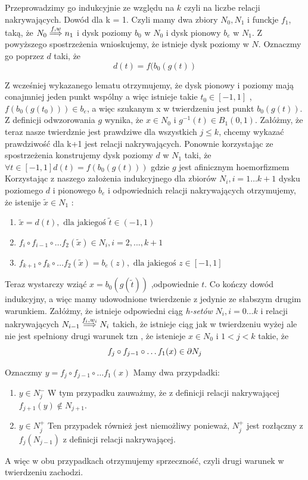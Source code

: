 Przeprowadzimy go indukcyjnie ze względu na $k$ czyli na liczbe relacji nakrywających.
Dowód dla k = 1.
Czyli mamy dwa zbiory $N_0,N_1$ i funckje $f_1$, taką, że $ N_0 \stackrel{f,w}{\Longrightarrow} n_1$ i 
dysk poziomy $ b_0 $ w $ N_0$ i dysk pionowy $b_e$ w $ N_1 $.
Z powyższego spostrzeżenia wnioskujemy, że istnieje dysk poziomy w $ N $. Oznaczmy 
go poprzez $ d $ taki, że 
$$
  d(t) = f(b_0(g(t))
$$

Z wcześniej wykazanego lematu otrzymujemy, że dysk pionowy i poziomy mają conajmniej jeden punkt wspólny 
a więc istnieje takie $ t_0 \in [-1,1] $ , $ f(b_0(g(t_0))) \in b_e $, a więc szukanym 
x w twierdzeniu jest punkt $b_0(g(t)) $. Z definicji odwzorowania $ g $ wynika, że $ x \in N_0 $ i 
$ g^{-1}(t) \in B_1(0,1) $.
Załóżmy, że teraz nasze twierdznie jest prawdziwe dla wszystkich $ j \leq k $, chcemy wykazać 
prawdziwość dla k+1 jest relacji nakrywających.
Ponownie korzystając ze spostrzeżenia konstrujemy dysk poziomy $ d $ w $ N_1 $ taki, że
$ \forall t \in [-1,1] d(t) = f(b_0(g(t))) $
gdzie $ g $ jest afinicznym hoemorfizmem
Korzystając z naszego założenia indukcyjnego dla zbiorów $ N_i , i = 1 \dots k+1 $ 
dysku poziomego $ d $ i pionowego $b_e$ i odpowiednich relacji nakrywających otrzymujemy, że 
istenije $ \tilde{x} \in N_1$ :
\begin{enumerate}
 \item $ \tilde{x} = d(t) , \mbox{ dla jakiegoś } \tilde{t} \in (-1,1) $
 \item $ f_i \circ f_{i-1} \circ \dots f_2(\tilde{x}) \in N_i , i = 2,...,k+1$
 \item $ f_{k+1} \circ f_{k} \circ \dots f_2(\tilde{x}) = b_e(z) , \mbox{ dla jakiegoś } z \in [-1,1]$
\end{enumerate}

Teraz wystarczy wziąć $ x = b_0(g(\tilde{t})) $ ,odpowiednie $ t $. Co kończy 
dowód indukcyjny, a więc mamy udowodnione twierdzenie z jedynie ze słabszym drugim warunkiem.
Załóżmy, że istnieje odpowiedni ciąg {\em h-setów } $ N_i , i = 0 \dots k $ i relacji nakrywających
$ N_{i-1} \stackrel{f_i,w_i}{\Longrightarrow} N_{i} $ takich, że istnieje ciąg jak w twierdzeniu wyżej ale 
nie jest spełniony drugi warunek tzn , że istenieje $ x \in N_0 $ i $ 1 < j < k $ takie, że
$$
     f_j \circ f_{j-1} \circ \dots f_1(x) \in \partial N_j 
$$

Oznaczmy $ y = f_j \circ f_{j-1} \circ \dots f_1(x) $
Mamy dwa przypdadki:
\begin{enumerate}
 \item $ y \in N^{-}_j $ \newline
  W tym przypadku zauważmy, że z definicji relacji nakrywającej $ f_{j+1}(y) \notin N_{j+1} $.
 \item $ y \in N^{+}_j $
  Ten przypadek również jest niemożliwy ponieważ, $ N^{+}_j $ jest rozłączny z $ f_j(N_{j-1}) $ z definicji
  relacji nakrywającej.
\end{enumerate} 
A więc w obu przypadkach otrzymujemy sprzeczność, czyli drugi warunek w twierdzeniu zachodzi.



